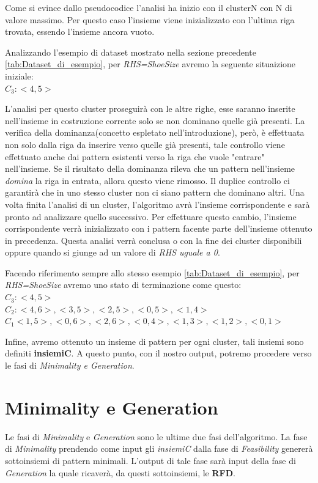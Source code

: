 Come si evince dallo pseudocodice l'analisi ha inizio con il clusterN con N di valore massimo.
Per questo caso l'insieme viene inizializzato con l'ultima riga trovata, essendo l'insieme ancora vuoto.
\begin{center}
	Analizzando l'esempio di dataset mostrato nella sezione precedente \ref{tab:Dataset_di_esempio}, per \emph{RHS=ShoeSize} avremo la seguente situaizione iniziale:\\
	$C_3: {<4,5>}$\\
\end{center}
L'analisi per questo cluster proseguirà con le altre righe, esse saranno inserite nell'insieme in costruzione corrente solo se non dominano quelle già presenti. La verifica della dominanza(concetto espletato nell'introduzione), però, è effettuata non solo dalla riga da inserire verso quelle già presenti, tale controllo viene effettuato anche dai pattern esistenti verso la riga che vuole "entrare" nell'insieme. Se il risultato della dominanza rileva che un pattern nell'insieme \emph{domina} la riga in entrata, allora questo viene rimosso.
Il duplice controllo ci garantirà che in uno stesso cluster non ci siano pattern che dominano altri.
Una volta finita l'analisi di un cluster, l'algoritmo avrà l'insieme corrispondente e sarà pronto ad analizzare quello successivo. Per effettuare questo cambio, l'insieme corrispondente verrà inizializzato con i pattern facente parte dell'insieme ottenuto in precedenza.
Questa analisi verrà conclusa o con la fine dei cluster disponibili oppure quando si giunge ad un valore di \emph{RHS uguale a 0}.
\begin{center}
	Facendo riferimento sempre allo stesso esempio \ref{tab:Dataset_di_esempio}, per \emph{RHS=ShoeSize} avremo uno stato di terminazione come questo:\\
	$C_3: {<4,5>}$\\
	$C_2: {<4,6>, <3,5>, <2,5>, <0,5>, <1,4>}$\\
	$C_1 {<1,5>, <0,6>, <2,6>, <0,4>, <1,3>, <1,2>, <0,1>}$\\
\end{center}
Infine, avremo ottenuto un insieme di pattern per ogni cluster, tali insiemi sono definiti \textbf{insiemiC}.
A questo punto, con il nostro output, potremo procedere verso le fasi di \emph{Minimality e Generation}.
\section{Minimality e Generation}
Le fasi di \emph{Minimality} e \emph{Generation} sono le ultime due fasi dell'algoritmo. La fase di \emph{Minimality} prendendo come input gli \emph{insiemiC} dalla fase di \emph{Feasibility} genererà sottoinsiemi di pattern minimali. L'output di tale fase sarà input della fase di \emph{Generation} la quale ricaverà, da questi sottoinsiemi, le \textbf{RFD}. 
